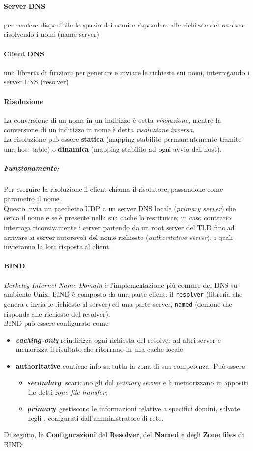 \documentclass[a4paper,11pt]{article}
\def\code#1{\texttt{#1}}
\def\vedi#1{\nameref{#1}}
\def\italic#1{\textit{#1}}
\begin{document}
\paragraph{Server DNS} per rendere disponibile lo spazio dei nomi e rispondere alle richieste del resolver risolvendo i nomi (name server)
\paragraph{Client DNS} una libreria di funzioni per generare e inviare le richieste sui nomi, interrogando i server DNS (resolver)
\newpage
\paragraph{Risoluzione}
La conversione di un nome in un indirizzo è detta \textit{risoluzione}, mentre la conversione di un indirizzo in nome è detta \textit{risoluzione inversa}.\\
La risoluzione può essere \textbf{statica} (mapping stabilito permanentemente tramite una host table) o \textbf{dinamica} (mapping stabilito ad ogni avvio dell'host).
\subparagraph{Funzionamento:} Per eseguire la risoluzione il client chiama il risolutore, passandone come parametro il nome. \\Questo invia un pacchetto UDP a un server DNS locale (\textit{primary server}) che cerca il nome e se è presente nella sua cache lo restituisce; in caso contrario interroga ricorsivamente i server partendo da un root server del TLD fino ad arrivare ai server autorevoli del nome richiesto (\textit{authoritative server}), i quali invieranno la loro risposta al client.

\paragraph{BIND} \textit{Berkeley Internet Name Domain} è l'implementazione più comune del DNS su ambiente Unix. BIND è composto da una parte client, il \code{resolver} (libreria che genera e invia le richieste al server) ed una parte server, \code{named} (demone che risponde alle richieste del resolver).\\
BIND può essere configurato come 
\begin{itemize}
\item \italic{\textbf{caching-only}} reindirizza ogni richiesta del resolver ad altri server e memorizza il risultato che ritornano in una cache locale
\item \textbf{authoritative} contiene info su tutta la zona di sua competenza. Può essere 
\begin{itemize}
\item \italic{\textbf{secondary}}: scaricano gli \vedi{Zone files} dal \italic{primary server} e li memorizzano in appositi file detti \italic{zone file transfer};
\item \italic{\textbf{primary}}: gestiscono le informazioni relative a specifici domini, salvate negli \vedi{Zone files}, confgurati dall'amministratore di rete.
\end{itemize}
\end{itemize}
Di seguito, le \textbf{Configurazioni} del \textbf{Resolver}, del \textbf{Named} e degli \textbf{Zone files} di BIND:
\end{document}
